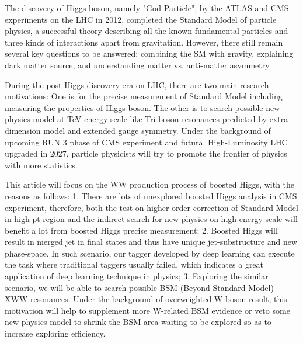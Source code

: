 \begin{eabstract}

    The discovery of Higgs boson, namely "God Particle", by the ATLAS and CMS experiments on the LHC in 2012, completed the Standard Model of particle physics, a successful theory describing all the known fundamental particles and three kinds of interactions apart from gravitation. However, there still remain several key questions to be answered: combining the SM with gravity, explaining dark matter source, and understanding matter vs. anti-matter asymmetry.
    
    During the post Higgs-discovery era on LHC, there are two main research motivations: One is for the precise measurement of Standard Model including measuring the properties of Higgs boson. The other is to search possible new physics model at TeV energy-scale like Tri-boson resonances predicted by extra-dimension model and extended gauge symmetry. Under the background of upcoming RUN 3 phase of CMS experiment and futural High-Luminosity LHC upgraded in 2027, particle physicists will try to promote the frontier of physics with more statistics.
    
    This article will focus on the WW production process of boosted Higgs, with the reasons as follows: 1. There are lots of unexplored boosted Higgs analysis in CMS experiment, therefore, both the test on higher-order correction of Standard Model in high pt region and the indirect search for new physics on high energy-scale will benefit a lot from boosted Higgs precise measurement; 2. Boosted Higgs will result in merged jet in final states and thus have unique jet-substructure and new phase-space. In such scenario, our tagger developed by deep learning can execute the task where traditional taggers usually failed, which indicates a great application of deep learning technique in physics; 3. Exploring the similar scenario, we will be able to search possible BSM (Beyond-Standard-Model) XWW resonances. Under the background of overweighted W boson result, this motivation will help to supplement more W-related BSM evidence or veto some new physics model to shrink the BSM area waiting to be explored so as to increase exploring efficiency.
    

\end{eabstract}
